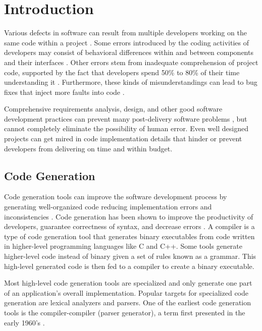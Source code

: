 \chapter{Introduction}
Various defects in software can result from multiple developers working on the same code within a project \cite{livshits_01}.  Some errors introduced by the coding activities of developers may consist of behavioral differences within and between components and their interfaces \cite{leveson_01,smidts_01,nakajo_01}.  Other errors stem from inadequate comprehension of project code, supported by the fact that developers spend 50\% to 80\% of their time understanding it \cite{sinha_01}.  Furthermore, these kinds of misunderstandings can lead to bug fixes that inject more faults into code \cite{smidts_01}.

\indent
Comprehensive requirements analysis, design, and other good software development practices can prevent many post-delivery software problems \cite{boehm_01}, but cannot completely eliminate the possibility of human error.  Even well designed projects can get mired in code implementation details that hinder or prevent developers from delivering on time and within budget.

\section{Code Generation}
Code generation tools can improve the software development process by generating well-organized code reducing implementation errors and inconsistencies \cite{boysen_01}.  Code generation has been shown to improve the productivity of developers, guarantee correctness of syntax, and decrease errors \cite{groher_01}.  A compiler is a type of code generation tool that generates binary executables from code written in higher-level programming languages like C and C++.   Some tools generate higher-level code instead of binary given a set of rules known as a grammar.  This high-level generated code is then fed to a compiler to create a binary executable.

\indent
Most high-level code generation tools are specialized and only generate one part of an application’s overall implementation.  Popular targets for specialized code generation are lexical analyzers and parsers.  One of the earliest code generation tools is the compiler-compiler (parser generator), a term first presented in the early 1960’s \cite{brooker_01}.

